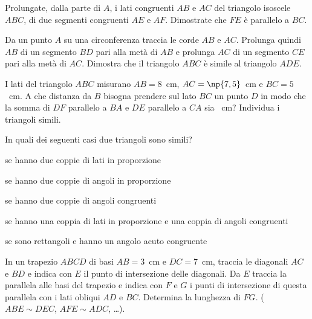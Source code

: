 \begin{multicols}{2}
\begin{esercizio}
\label{ese:6.77}
Prolungate, dalla parte di $A$, i lati congruenti $AB$ e $AC$ del 
triangolo isoscele $ABC$, di due segmenti congruenti $AE$ e $AF$. 
Dimostrate che $FE$ è parallelo a $BC$.
\end{esercizio}

\begin{esercizio}
\label{ese:6.78}
Da un punto $A$ su una circonferenza traccia le corde $AB$ e $AC$. 
Prolunga quindi $AB$ di un segmento $BD$ pari alla metà di $AB$ e 
prolunga $AC$ di un segmento $CE$ pari alla metà di $AC$. Dimostra 
che il triangolo $ABC$ è simile al triangolo $ADE$.
\end{esercizio}

\begin{esercizio}
\label{ese:6.79}
I lati del triangolo $ABC$ misurano $AB=8$~cm, $AC=\np{7,5}$~cm e 
$BC=5$~cm. A che distanza da $B$ bisogna prendere sul lato $BC$ un 
punto $D$ in modo che la somma di $DF$ parallelo a $BA$ e $DE$ 
parallelo a $CA$ sia ~cm? Individua i triangoli simili.
\end{esercizio}

\begin{esercizio}
\label{ese:6.80}
In quali dei seguenti casi due triangoli sono simili?
\begin{enumeratea}
\item se hanno due coppie di lati in 
proporzione\tab\hfill\boxV\quad\boxF
\item se hanno due coppie di angoli in 
proporzione\tab\hfill\boxV\quad\boxF
\item se hanno due coppie di angoli 
congruenti\tab\hfill\boxV\quad\boxF
\item se hanno una coppia di lati in proporzione e una coppia di 
angoli congruenti\tab\hfill\boxV\quad\boxF
\item se sono rettangoli e hanno un angolo acuto 
congruente\hfill\boxV\quad\boxF
\end{enumeratea}
\end{esercizio}

\begin{esercizio}
\label{ese:6.81}
In un trapezio $ABCD$ di basi $AB=3$~cm e $DC=7$~cm, traccia le 
diagonali $AC$ e $BD$ e indica con $E$ il punto di intersezione delle 
diagonali. Da $E$ traccia la parallela alle basi del trapezio e 
indica con $F$ e $G$ i punti di intersezione di questa parallela con i 
lati obliqui $AD$ e $BC$. Determina la lunghezza di $FG$. ($ABE\sim 
DEC$, $AFE\sim ADC$, \ldots).
\end{esercizio}


\end{multicols}
